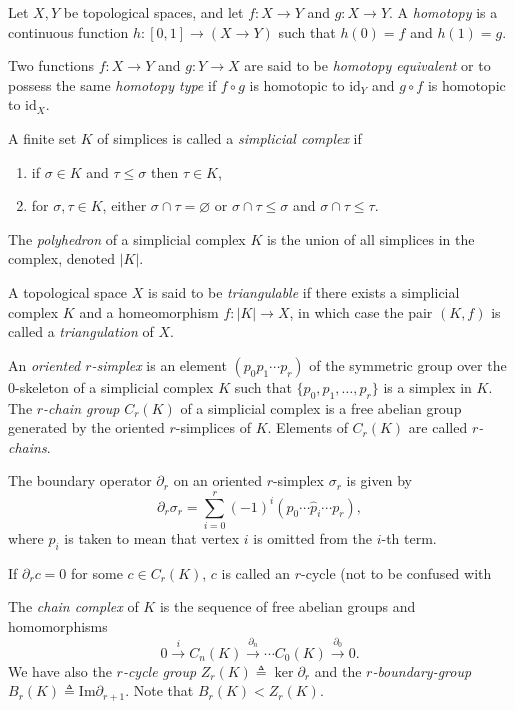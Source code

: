 \documentclass{article}
\begin{document}
\begin{defn}
Let $X, Y$ be topological spaces, and let $f : X \to Y$ and
$g : X \to Y$. A \emph{homotopy} is a continuous function
$h : [0,1] \to (X \to Y)$ such that $h(0) = f$ and $h(1) = g$.

Two functions $f : X \to Y$ and $g : Y \to X$ are said to be
\emph{homotopy equivalent} or to possess the same \emph{homotopy type}
if $f \circ g$ is homotopic to $\mathrm{id}_Y$ and $g \circ f$ is
homotopic to
$\mathrm{id}_X$.
\end{defn}

\begin{defn}
A finite set $K$ of simplices is called a \emph{simplicial complex} if
\begin{enumerate}
  \item{if $\sigma \in K$ and $\tau \leq \sigma$ then
        $\tau \in K$,}
  \item{for $\sigma, \tau \in K$, either $\sigma \cap \tau =
      \varnothing$ or $\sigma \cap \tau \leq \sigma$ and $\sigma \cap
      \tau \leq \tau$.
       }
\end{enumerate}
\end{defn}

\begin{defn}
The \emph{polyhedron} of a simplicial complex $K$ is the union of all
simplices in the complex, denoted $|K|$.

A topological space $X$ is
said to be \emph{triangulable} if there exists a simplicial complex
$K$ and a homeomorphism $f : |K| \to X$, in which case the pair
$(K, f)$ is called a \emph{triangulation} of $X$.
\end{defn}

\begin{defn}
An \emph{oriented $r$-simplex} is an element
$(p_0 p_1 \cdots p_r)$ of the symmetric group
over the $0$-skeleton of a simplicial complex $K$ such that
$\{p_0, p_1, \dots, p_r\}$ is a simplex in $K$. The
\emph{$r$-chain group} $C_r(K)$ of a simplicial complex is a free
abelian group generated by the oriented $r$-simplices of $K$. Elements
of $C_r(K)$ are called \emph{$r$-chains}.
\end{defn}

\begin{defn}
The boundary operator $\partial_r$ on an oriented $r$-simplex
$\sigma_r$ is given by
$$
\partial_r \sigma_r
= \sum_{i = 0}^r (-1)^i(p_0 \cdots \hat{p}_i \cdots p_r),
$$
where $\hat{p}_i$ is taken to mean that vertex $i$ is omitted from the
$i$-th term.

If $\partial_r c = 0$ for some $c \in C_r(K)$, $c$ is called an
$r$-cycle (not to be confused with

The \emph{chain complex} of $K$ is the sequence of
free abelian groups and homomorphisms
$$
0      \xrightarrow{i}
C_n(K) \xrightarrow{\partial_n}
\cdots
C_0(K) \xrightarrow{\partial_0}
0.
$$
We have also the \emph{$r$-cycle group}
$Z_r(K) \triangleq \ker \partial_r$ and the
\emph{$r$-boundary-group}
$B_r(K) \triangleq \mathrm{Im} \partial_{r+1}$. Note that
$B_r(K) < Z_r(K)$.
\end{defn}
\end{document}
